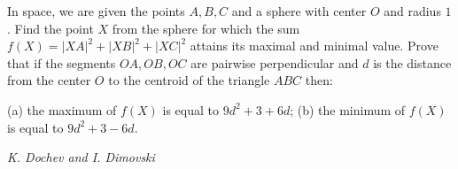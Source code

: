 In space, we are given the points $A,B,C$ and a sphere with center $O$ and radius $1$. Find the point $X$ from the sphere for which the sum $f(X)=|XA|^2+|XB|^2+|XC|^2$ attains its maximal and minimal value. Prove that if the segments $OA,OB,OC$ are pairwise perpendicular and $d$ is the distance from the center $O$ to the centroid of the triangle $ABC$ then:

(a) the maximum of $f(X)$ is equal to $9d^2+3+6d$;
(b) the minimum of $f(X)$ is equal to $9d^2+3-6d$.

\textit{K. Dochev and I. Dimovski}